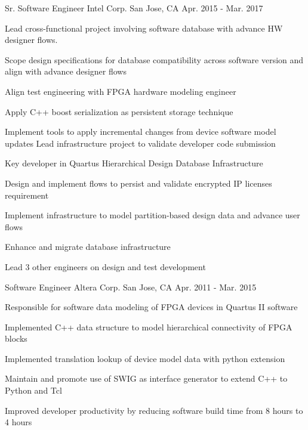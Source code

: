 \documentclass[12pt, letterpaper]{awesome-cv}
\begin{document}
\begin{cventries}
	\cventry
		{Sr. Software Engineer} %
		{Intel Corp.} %
		{San Jose, CA} %
		{Apr. 2015 - Mar. 2017} %
		{ %
			\begin{cvdescription}
				Lead cross-functional project involving software database with advance HW designer flows.
			\end{cvdescription}
			\begin{cvitems}
				\item {Scope design specifications for database compatibility across software version and align with advance designer flows}
				\item {Align test engineering with FPGA hardware modeling engineer}
				\item {Apply C++ boost serialization as persistent storage technique}
				\item {Implement tools to apply incremental changes from device software model updates Lead infrastructure project to validate developer code submission}
			\end{cvitems}
			\begin{cvsubdescription}
				Key developer in Quartus Hierarchical Design Database Infrastructure
			\end{cvsubdescription}
			\begin{cvitems}
				\item {Design and implement flows to persist and validate encrypted IP licenses requirement}
				\item {Implement infrastructure to model partition-based design data and advance user flows}
				\item {Enhance and migrate database infrastructure}
				\item {Lead 3 other engineers on design and test development}
			\end{cvitems}
		}

	\cventry
		{Software Engineer} %
		{Altera Corp.} %
		{San Jose, CA} %
		{Apr. 2011 - Mar. 2015} %
		{ %
			\begin{cvdescription}
				Responsible for software data modeling of FPGA devices in Quartus II software
			\end{cvdescription}
			\begin{cvitems}
				\item {Implemented C++ data structure to model hierarchical connectivity of FPGA blocks}
				\item {Implemented translation lookup of device model data with python extension}
				\item {Maintain and promote use of SWIG as interface generator to extend C++ to Python and Tcl}
				\item {Improved developer productivity by reducing software build time from 8 hours to 4 hours}
			\end{cvitems}
		} 


\end{cventries}
\end{document}
